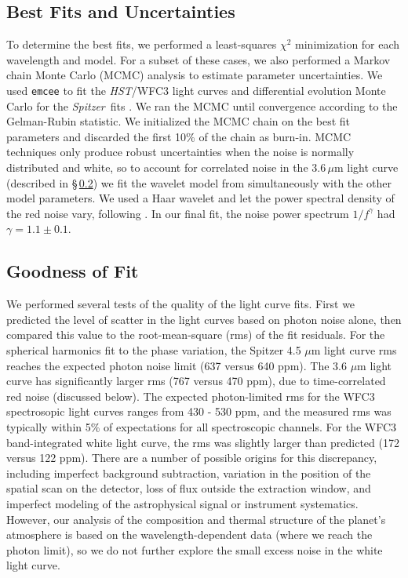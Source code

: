 \documentclass[twocolumn]{aastex61}
\newcommand{\project}[1]{\textsl{#1}}
\newcommand{\HST}{\project{HST}}
\newcommand{\Spitzer}{\project{Spitzer}}
\begin{document}
\subsection{Best Fits and Uncertainties}
To determine the best fits, we performed a least-squares $\chi^2$ minimization for each wavelength and model. For a subset of these cases, we also performed a Markov chain Monte Carlo (MCMC) analysis to estimate parameter uncertainties. We used \texttt{emcee} \citep{foremanmackey13} to fit the \HST/WFC3 light curves and differential evolution Monte Carlo for the \Spitzer\ fits \citep{braak06}. We ran the MCMC until convergence according to the Gelman-Rubin statistic. We initialized the MCMC chain on the best fit parameters and discarded the first 10\% of the chain as burn-in. MCMC techniques only produce robust uncertainties when the noise is normally distributed and white, so to account for correlated noise in the $3.6\,\mu$m light curve (described in \S\,\ref{sec:fitquality}) we fit the wavelet model from \cite{carter09} simultaneously with the other model parameters. We used a Haar wavelet and let the power spectral density of the red noise vary, following \cite{diamond-lowe14}. In our final fit, the noise power spectrum $1/f^\gamma$ had $\gamma = 1.1 \pm 0.1$.  

\subsection{Goodness of Fit}
\label{sec:fitquality}
We performed several tests of the quality of the light curve fits.  First we predicted the level of scatter in the light curves based on photon noise alone, then compared this value to the root-mean-square (rms) of the fit residuals.  For the spherical harmonics fit to the phase variation, the Spitzer 4.5 $\mu$m light curve rms reaches the expected photon noise limit (637 versus 640 ppm). The 3.6 $\mu$m light curve has significantly larger rms (767 versus 470 ppm), due to time-correlated red noise (discussed below). The expected photon-limited rms for the WFC3 spectrosopic light curves ranges from 430 - 530 ppm, and the measured rms was typically within 5\% of expectations for all spectroscopic channels.  For the WFC3 band-integrated white light curve, the rms was slightly larger than predicted (172 versus 122 ppm). There are a number of possible origins for this discrepancy, including imperfect background subtraction, variation in the position of the spatial scan on the detector, loss of flux outside the extraction window, and imperfect modeling of the astrophysical signal or instrument systematics. However, our analysis of the composition and thermal structure of the planet's atmosphere is based on the wavelength-dependent data (where we reach the photon limit), so we do not further explore the small excess noise in the white light curve. 
\end{document}
